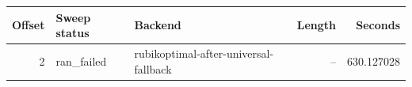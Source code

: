 {\small
\begin{tabular}{rllrr}
\hline
Offset & Sweep status & Backend & Length & Seconds \\
\hline
2 & ran_failed & rubikoptimal-after-universal-fallback & -- & 630.127028 \\
\hline
\end{tabular}
}
